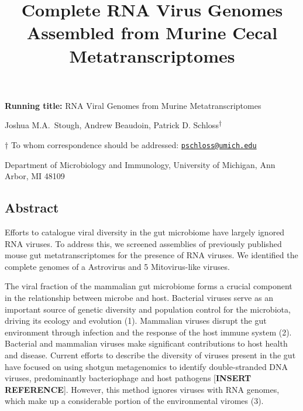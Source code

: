 \documentclass[11pt,]{article}
\title{\textbf{Complete RNA Virus Genomes Assembled from Murine Cecal
Metatranscriptomes}}
\author{}
\date{}
\begin{document}
\maketitle

\vspace{35mm}

\textbf{Running title:} RNA Viral Genomes from Murine Metatranscriptomes

\vspace{35mm}

Joshua M.A.~Stough, Andrew Beaudoin, Patrick D.
Schloss\textsuperscript{\(\dagger\)}

\vspace{40mm}

\(\dagger\) To whom correspondence should be addressed:
\href{mailto:pschloss@umich.edu}{\nolinkurl{pschloss@umich.edu}}

Department of Microbiology and Immunology, University of Michigan, Ann
Arbor, MI 48109

\newpage
\linenumbers

\hypertarget{abstract}{%
\subsection{Abstract}\label{abstract}}

Efforts to catalogue viral diversity in the gut microbiome have largely
ignored RNA viruses. To address this, we screened assemblies of
previously published mouse gut metatranscriptomes for the presence of
RNA viruses. We identified the complete genomes of a Astrovirus and 5
Mitovirus-like viruses.

\newpage

The viral fraction of the mammalian gut microbiome forms a crucial
component in the relationship between microbe and host. Bacterial
viruses serve as an important source of genetic diversity and population
control for the microbiota, driving its ecology and evolution (1).
Mammalian viruses disrupt the gut environment through infection and the
response of the host immune system (2). Bacterial and mammalian viruses
make significant contributions to host health and disease. Current
efforts to describe the diversity of viruses present in the gut have
focused on using shotgun metagenomics to identify double-stranded DNA
viruses, predominantly bacteriophage and host pathogens
{[}\textbf{INSERT REFERENCE}{]}. However, this method ignores viruses
with RNA genomes, which make up a considerable portion of the
environmental viromes (3).
\end{document}
